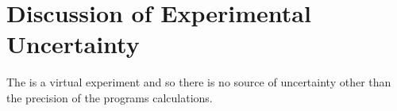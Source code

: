 \documentclass{article}
\begin{document}



\section{Discussion of Experimental Uncertainty}

The is a virtual experiment and so there is no source of uncertainty other than
the precision of the programs calculations.
\end{document}

